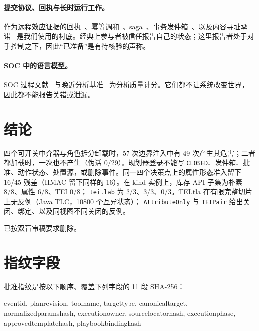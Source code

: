 \documentclass[acmsmall,manuscript,review,anonymous]{acmart}
\renewcommand{\_}{\discretionary{\textunderscore}{}{\textunderscore}}
\begin{document}
\paragraph{提交协议、回执与长时运行工作。}
作为远程效应证据的回执~\cite{gray1978notes}、幂等调和~\cite{helland2007apostate}、saga~\cite{garciamolina1987sagas}、事务发件箱~\cite{richardson2019microservices}、以及内容寻址承诺~\cite{merkle1980protocols} 是我们使用的衬底。经典上参与者被信任报告自己的状态；这里报告者处于对手控制之下，因此“已准备”是有待核验的声称。

\paragraph{SOC 中的语言模型。}
SOC 过程文献~\cite{kokulu2019matched,goodall2004work,sundaramurthy2016turning}
与晚近分析基准~\cite{wei2025cortex,deason2025cybersoceval,jajodia2026siabench}
为分析质量计分。它们都不让系统改变世界，因此都不能报告关错或泄漏。

\section{结论}
\label{sec:conc}

四个可开关中介器与角色拆分卸载时，57 次边界注入中有 49 次产生其危害；二者都加载时，一次也不产生（伪活 0/29）。规划器登录不能写
\texttt{CLOSED}、发件箱、批准、动作状态、处置源，或删除事件。同一四个决策点上的属性形态准入留下 16/45 残差（{HMAC} 留下同样的 16）。在 kind 实例上，库存-{API} 子集为朴素 8/8、属性 6/8、{TEI} 0/8；
\texttt{tei.lab} 为 3/3、3/3、0/3。{TEI.tla} 在有限完整切片上无反例（Java {TLC}，10800 个互异状态）；
\texttt{AttributeOnly} 与 \texttt{TEIPair} 给出关闭、绑定、以及同视图不同关闭的反例。

\begin{acks}
已按双盲审稿要求删除。
\end{acks}




\appendix
\section{指纹字段}
\label{app:fp}

批准指纹是按以下顺序、覆盖下列字段的 11 段 SHA-256：

\begin{flushleft}\small\ttfamily
event\_id, plan\_revision, tool\_name, target\_type, canonical\_target,
normalized\_params\_hash, execution\_owner, source\_locator\_hash,
execution\_phase, approved\_template\_hash, playbook\_binding\_hash
\end{flushleft}
\end{document}
